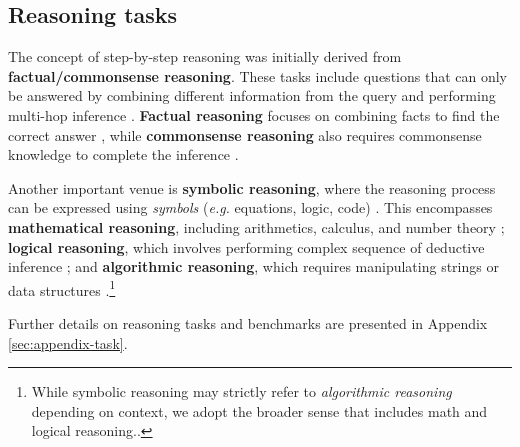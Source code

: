 \subsection{Reasoning tasks}

The concept of step-by-step reasoning was initially derived from \textbf{factual/commonsense reasoning}. These tasks include questions that can only be answered by combining different information from the query and performing multi-hop inference \citep{mavi2024multihopquestionanswering}. \textbf{Factual reasoning} focuses on combining facts to find the correct answer \citep{yang-etal-2018-hotpotqa, talmor-berant-2018-web, kwiatkowski-etal-2019-natural}, while \textbf{commonsense reasoning} also requires commonsense knowledge to complete the inference \citep{clark2018thinksolvedquestionanswering, talmor-etal-2019-commonsenseqa, geva-etal-2021-aristotle, trivedi-etal-2022-musique}.



Another important venue is \textbf{symbolic reasoning}, where the reasoning process can be expressed using \textit{symbols} (\textit{e.g.} equations, logic, code) \citep{sprague2024cotcotchainofthoughthelps}. This encompasses \textbf{mathematical reasoning}, including arithmetics, calculus, and number theory \citep{cobbe2021trainingverifierssolvemath, NEURIPSDnB2021_be83ab3e, he-etal-2024-olympiadbench, gao2024omnimathuniversalolympiadlevel}; \textbf{logical reasoning}, which involves performing complex sequence of deductive inference \citep{tafjord-etal-2021-proofwriter, han-etal-2024-folio, PrOntoQA}; and \textbf{algorithmic reasoning}, which requires manipulating strings or data structures \citep{srivastava2023imitationgamequantifyingextrapolating, suzgun2022challengingbigbenchtaskschainofthought, NEURIPS2023_7a92bcde}.\footnote{While symbolic reasoning may strictly refer to \textit{algorithmic reasoning} \citep{NEURIPS2022_9d560961} depending on context, we adopt the broader sense that includes math and logical reasoning.\citep{sprague2024cotcotchainofthoughthelps}.}

 
Further details on reasoning tasks and benchmarks are presented in Appendix \ref{sec:appendix-task}.




